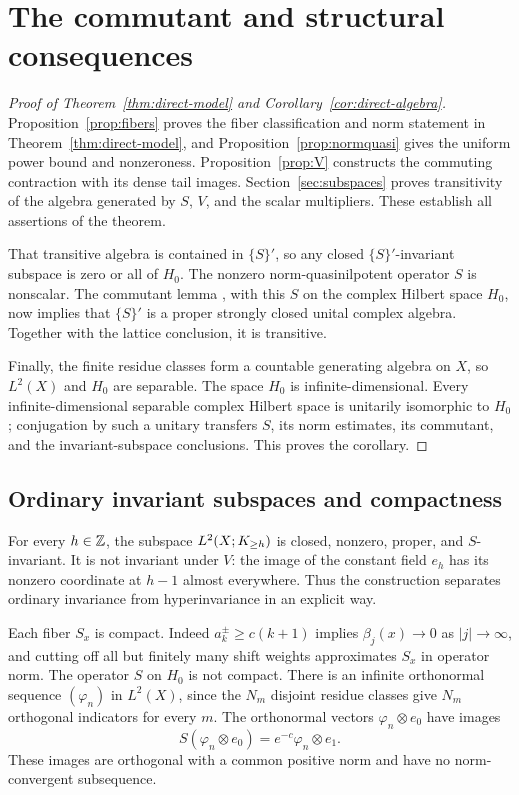\section{The commutant and structural consequences}\label{sec:structure}
\begin{proof}[Proof of Theorem~\ref{thm:direct-model} and Corollary~\ref{cor:direct-algebra}]
Proposition~\ref{prop:fibers} proves the fiber classification and norm
statement in Theorem~\ref{thm:direct-model}, and
Proposition~\ref{prop:normquasi} gives the uniform power bound and
nonzeroness. Proposition~\ref{prop:V} constructs the commuting
contraction with its dense tail images. Section~\ref{sec:subspaces}
proves transitivity of the algebra generated by $S$, $V$, and the
scalar multipliers. These establish all assertions of the theorem.

That transitive algebra is contained in $\{S\}'$, so any closed
$\{S\}'$-invariant subspace is zero or all of $H_0$. The nonzero
norm-quasinilpotent operator $S$ is nonscalar. The commutant lemma
\cite[\CommutantImportLocator]{CircleCompanion}, with this $S$ on the
complex Hilbert space $H_0$, now implies that $\{S\}'$ is a proper
strongly closed unital complex algebra. Together with the lattice
conclusion, it is transitive.

Finally, the finite residue classes form a countable generating algebra
on $X$, so $L^2(X)$ and $H_0$ are separable. The space $H_0$ is
infinite-dimensional. Every infinite-dimensional separable complex
Hilbert space is unitarily isomorphic to $H_0$; conjugation by such a
unitary transfers $S$, its norm estimates, its commutant, and the
invariant-subspace conclusions. This proves the corollary.
\end{proof}

\subsection{Ordinary invariant subspaces and compactness}
For every $h\in\mathbb Z$, the subspace $L^2(X;K_{\ge h})$ is closed,
nonzero, proper, and $S$-invariant. It is not invariant under $V$:
the image of the constant field $e_h$ has its nonzero coordinate at
$h-1$ almost everywhere. Thus the construction separates ordinary
invariance from hyperinvariance in an explicit way.

Each fiber $S_x$ is compact. Indeed $a_k^\pm\ge c(k+1)$ implies
$\beta_j(x)\to0$ as $|j|\to\infty$, and cutting off all but finitely
many shift weights approximates $S_x$ in operator norm. The operator
$S$ on $H_0$ is not compact. There is an infinite orthonormal sequence
$(\varphi_n)$ in $L^2(X)$, since the $N_m$ disjoint residue classes give
$N_m$ orthogonal indicators for every $m$. The orthonormal vectors
$\varphi_n\otimes e_0$ have images
\[
 S(\varphi_n\otimes e_0)=e^{-c}\varphi_n\otimes e_1.
\]
These images are orthogonal with a common positive norm and have no
norm-convergent subsequence.

